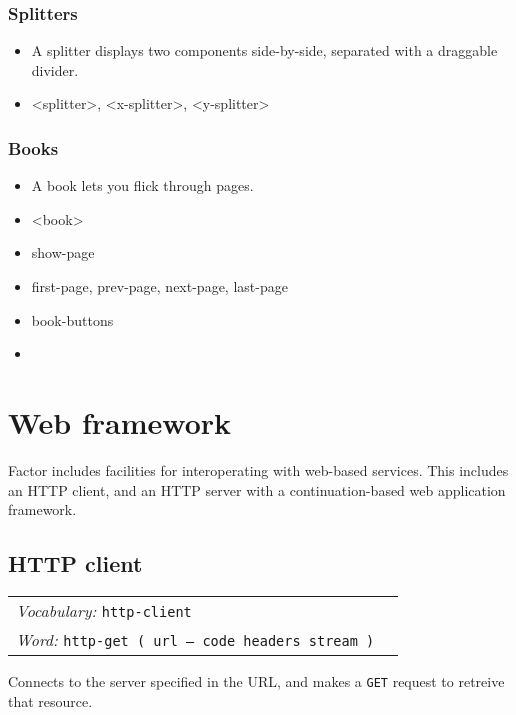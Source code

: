 \documentclass{book}
\newcommand{\vocabulary}[1]{\emph{Vocabulary:} \texttt{#1}&\\}
\newcommand{\ordinaryword}[2]{\index{\texttt{#1}}\emph{Word:} \texttt{#2}&\\}
\newcommand{\wordtable}[1]{


\begin{tabularx}{12cm}{lX}
\hline
#1
\hline
\end{tabularx}

}
\begin{document}
\subsection{Splitters}

\begin{itemize}

\item A splitter displays two components side-by-side, separated with a draggable divider.

\item <splitter>, <x-splitter>, <y-splitter>

\end{itemize}

\subsection{Books}

\begin{itemize}

\item A book lets you flick through pages.

\item <book>

\item show-page

\item first-page, prev-page, next-page, last-page

\item book-buttons

\item <book-browser>

\end{itemize}

\chapter{Web framework}

Factor includes facilities for interoperating with web-based services. This includes an HTTP client, and an HTTP server with a continuation-based web application framework.

\section{HTTP client}

\wordtable{
\vocabulary{http-client}
\ordinaryword{http-get}{http-get ( url -- code headers stream )}
}
Connects to the server specified in the URL, and makes a \verb|GET| request to retreive that resource.
\end{document}
